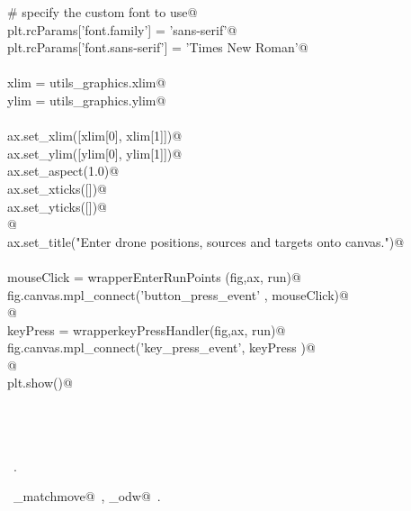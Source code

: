 \documentclass[10pt, english, oneside]{report}
\begin{document}
\begin{appendices}
\begin{flushleft}
\begin{list}{}{}
\mbox{}\verb@    # specify the custom font to use@\\
\mbox{}\verb@    plt.rcParams['font.family'] = 'sans-serif'@\\
\mbox{}\verb@    plt.rcParams['font.sans-serif'] = 'Times New Roman'@\\
\mbox{}\verb@@\\
\mbox{}\verb@    xlim = utils_graphics.xlim@\\
\mbox{}\verb@    ylim = utils_graphics.ylim@\\
\mbox{}\verb@@\\
\mbox{}\verb@    ax.set_xlim([xlim[0], xlim[1]])@\\
\mbox{}\verb@    ax.set_ylim([ylim[0], ylim[1]])@\\
\mbox{}\verb@    ax.set_aspect(1.0)@\\
\mbox{}\verb@    ax.set_xticks([])@\\
\mbox{}\verb@    ax.set_yticks([])@\\
\mbox{}\verb@          @\\
\mbox{}\verb@    ax.set_title("Enter drone positions, sources and targets onto canvas.")@\\
\mbox{}\verb@@\\
\mbox{}\verb@    mouseClick   = wrapperEnterRunPoints (fig,ax, run)@\\
\mbox{}\verb@    fig.canvas.mpl_connect('button_press_event' , mouseClick)@\\
\mbox{}\verb@          @\\
\mbox{}\verb@    keyPress     = wrapperkeyPressHandler(fig,ax, run)@\\
\mbox{}\verb@    fig.canvas.mpl_connect('key_press_event', keyPress   )@\\
\mbox{}\verb@    @\\
\mbox{}\verb@    plt.show()@\\
\mbox{}\verb@@\\
\mbox{}\verb@@\\
\mbox{}\verb@@\\
\mbox{}\verb@@{\NWsep}
\end{list}
\vspace{-1.5ex}
\footnotesize
\begin{list}{}{\setlength{\itemsep}{-\parsep}\setlength{\itemindent}{-\leftmargin}}
\item \NWtxtMacroRefIn\ .
\item \NWtxtIdentsUsed\nobreak\  \verb@algo_matchmove@\nobreak\ , \verb@algo_odw@\nobreak\ .
\item{}
\end{list}
\vspace{4ex}
\end{flushleft}


\end{appendices}
\end{document}
